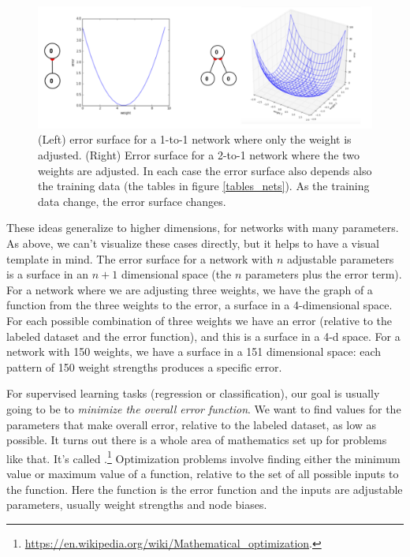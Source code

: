 \begin{figure}[h]
\centering
\includegraphics[scale=.5]{./images/ErrorSurfaces.png}
\caption[Jeff Yoshimi.]{(Left) error surface for a 1-to-1 network where only the weight is adjusted. (Right) Error surface for a 2-to-1 network where the two weights are adjusted. In each case the error surface also depends also the training data (the tables in figure \ref{tables_nets}). As the training data change, the error surface changes. }
\label{error_surfaces}
\end{figure}

These ideas generalize to higher dimensions, for networks with many parameters. As above, we can't visualize these cases directly, but it helps to have a visual template in mind. The error surface for a network with $n$ adjustable parameters is a surface in an $n+1$ dimensional space (the $n$ parameters plus the error term). For a network where we are adjusting three weights, we have the graph of a function from the three weights to the error, \ie a surface in a 4-dimensional space. For each possible combination of three weights we have an error (relative to the labeled dataset and the error function), and this is a surface in a 4-d space. For a network with 150 weights, we have a surface in a 151 dimensional space: each pattern of 150 weight strengths produces a specific error.

For supervised learning tasks (regression or classification), our goal is usually going to be to \emph{minimize the overall error function}. We want to find values for the parameters that make overall error, relative to the labeled dataset, as low as possible. It turns out there is a whole area of mathematics set up for problems like that. It's called .\footnote{\url{https://en.wikipedia.org/wiki/Mathematical_optimization}.} Optimization problems involve finding either the minimum value or maximum value of a function, relative to the set of all possible inputs to the function. Here the function is the error function and the inputs are adjustable parameters, usually weight strengths and node biases. 

